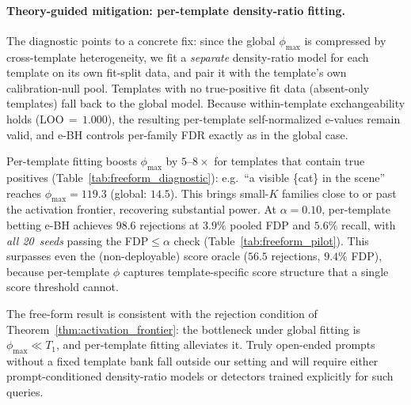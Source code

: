 \documentclass{article}
\theoremstyle{remark}
\newcommand{\1}{\mathbf{1}}
\begin{document}
\paragraph{Theory-guided mitigation: per-template density-ratio fitting.}
\label{par:mitigation}
The diagnostic points to a concrete fix: since the global $\phi_{\max}$ is
compressed by cross-template heterogeneity, we fit a \emph{separate}
density-ratio model for each template on its own fit-split data, and pair
it with the template's own calibration-null pool.  Templates with no
true-positive fit data (absent-only templates) fall back to the global
model.  Because within-template exchangeability holds (LOO\,$=$\,$1.000$),
the resulting per-template self-normalized e-values remain valid, and
e-BH controls per-family FDR exactly as in the global case.

Per-template fitting boosts $\phi_{\max}$ by $5$--$8\times$ for templates
that contain true positives (Table~\ref{tab:freeform_diagnostic}): e.g.\
``a visible \{cat\} in the scene'' reaches
$\phi_{\max}\!=\!119.3$ (global: $14.5$).  This brings
small-$K$ families close to or past the activation frontier, recovering
substantial power.  At $\alpha\!=\!0.10$, per-template betting e-BH
achieves $98.6$ rejections at $3.9\%$ pooled FDP and $5.6\%$ recall,
with \emph{all 20~seeds} passing the FDP$\le\alpha$ check
(Table~\ref{tab:freeform_pilot}).  This surpasses even the
(non-deployable) score oracle ($56.5$ rejections, $9.4\%$ FDP), because
per-template $\phi$ captures template-specific score structure that a
single score threshold cannot.

The free-form result is consistent with the rejection condition of
Theorem~\ref{thm:activation_frontier}: the bottleneck under global
fitting is $\phi_{\max}\!\ll\!T_1$, and per-template fitting
alleviates it. Truly open-ended prompts without a fixed template
bank fall outside our setting and will require either
prompt-conditioned density-ratio models or detectors trained
explicitly for such queries.
\end{document}
